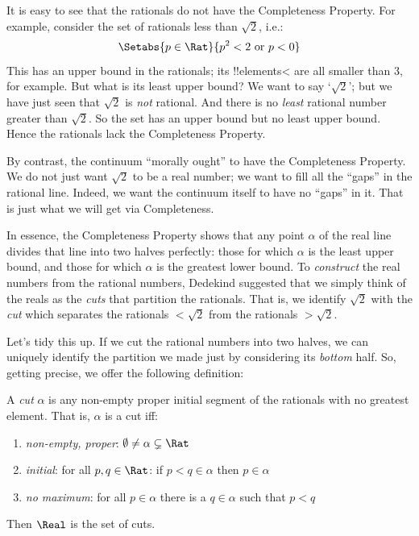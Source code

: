 It is easy to see that the rationals do not have the Completeness Property. For example, consider the set of rationals less than $\sqrt{2}$, i.e.:
\[
	\Setabs{p \in \Rat}{p^2 < 2 \text{ or }p < 0}
\]
This has an upper bound in the rationals; its !!{element}s< are all  smaller than $3$, for example. But what is its least upper bound? We want to say `$\sqrt{2}$'; but we have just seen that $\sqrt{2}$ is \emph{not} rational. And there is no \emph{least} rational number greater than $\sqrt{2}$. So the set has an upper bound but no least upper bound. Hence the rationals lack the Completeness Property.

By contrast, the continuum ``morally ought'' to have the Completeness Property. We do not just want $\sqrt{2}$ to be a real number; we want to fill all the ``gaps'' in the rational line. Indeed, we want the continuum itself to have no ``gaps'' in it. That is just what we will get via Completeness.





In essence, the Completeness Property shows that any point $\alpha$ of
the real line divides that line into two halves perfectly: those for
which $\alpha$ is the least upper bound, and those for which $\alpha$
is the greatest lower bound. To \emph{construct} the real numbers from
the rational numbers, Dedekind suggested that we simply think of the
reals as the \emph{cuts} that partition the rationals. That is, we
identify $\sqrt{2}$ with the \emph{cut} which separates the rationals
$< \sqrt{2}$ from the rationals $> \sqrt{2}$. 

Let's tidy this up. If we cut the rational numbers into two halves, we
can uniquely identify the partition we made just by considering its
\emph{bottom} half. So, getting precise, we offer the following
definition:

\begin{defn}[Cut] 
A \emph{cut} $\alpha$ is any non-empty proper
initial segment of the rationals with no greatest element. That is,
$\alpha$ is a cut iff:
\begin{enumerate}
	\item \emph{non-empty, proper}: $\emptyset \neq \alpha \subsetneq \Rat$
	\item \emph{initial}: for all $p,q \in \Rat$: if $p < q \in \alpha$ then $p \in \alpha$
	\item \emph{no maximum}: for all $p \in \alpha$ there is a $q \in \alpha$ such that $p < q$ 
\end{enumerate} 
Then $\Real$ is the set of cuts. 
\end{defn}

